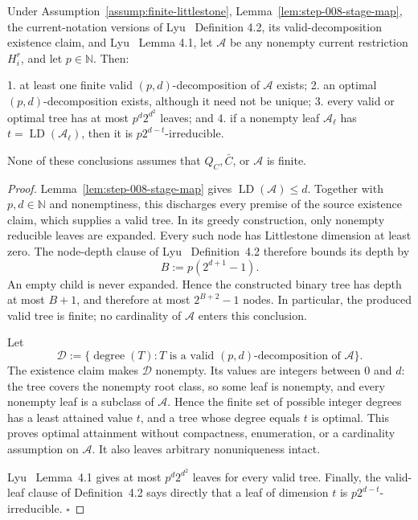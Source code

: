 \begin{proposition}\label{prop:step-008-decompositions}
Under Assumption~\ref{assump:finite-littlestone},
Lemma~\ref{lem:step-008-stage-map}, the current-notation versions
of Lyu~\citep{lyu2025} Definition 4.2, its valid-decomposition existence claim, and
Lyu~\citep{lyu2025} Lemma 4.1, let \(\mathcal A\) be any nonempty current restriction
\(H_i^r\), and let \(p\in\mathbb N\). Then:

1. at least one finite valid \((p,d)\)-decomposition of \(\mathcal A\)
   exists;
2. an optimal \((p,d)\)-decomposition exists, although it need not be
   unique;
3. every valid or optimal tree has at most \(p^d2^{d^2}\) leaves; and
4. if a nonempty leaf \(\mathcal A_\ell\) has
   \(t=\operatorname{LD}(\mathcal A_\ell)\), then it is
   \(p2^{d-t}\)-irreducible.

None of these conclusions assumes that \(Q_C,\bar C\), or
\(\mathcal A\) is finite.


\end{proposition}

\begin{proof}
Lemma~\ref{lem:step-008-stage-map} gives
\(\operatorname{LD}(\mathcal A)\le d\). Together with \(p,d\in\mathbb N\)
and nonemptiness, this discharges every premise of the source existence
claim, which supplies a valid tree. In its greedy construction, only
nonempty reducible leaves are expanded. Every such node has Littlestone
dimension at least zero. The node-depth clause of Lyu~\citep{lyu2025}
Definition~4.2 therefore bounds its depth by
\[
 B:=p(2^{d+1}-1).
\]
An empty child is never expanded. Hence the constructed binary tree has
depth at most \(B+1\), and therefore at most
\(2^{B+2}-1\) nodes. In particular, the produced valid tree is finite; no
cardinality of \(\mathcal A\) enters this conclusion.

Let
\[
 \mathscr D
 :=\{\operatorname{degree}(T):T\text{ is a valid }(p,d)
                         \text{-decomposition of }\mathcal A\}.
\]
The existence claim makes \(\mathscr D\) nonempty. Its values are integers
between \(0\) and \(d\): the tree covers the nonempty root class, so some
leaf is nonempty, and every nonempty leaf is a subclass of
\(\mathcal A\). Hence the finite set of possible integer degrees has a
least attained value \(t\), and a tree whose degree equals \(t\) is
optimal. This proves optimal attainment without compactness, enumeration,
or a cardinality assumption on \(\mathcal A\). It also leaves arbitrary
nonuniqueness intact.

Lyu~\citep{lyu2025} Lemma~4.1 gives at most \(p^d2^{d^2}\) leaves for every
valid tree. Finally, the valid-leaf clause of Definition~4.2 says directly
that a leaf of dimension \(t\) is \(p2^{d-t}\)-irreducible.
\(\square\)


\end{proof}

